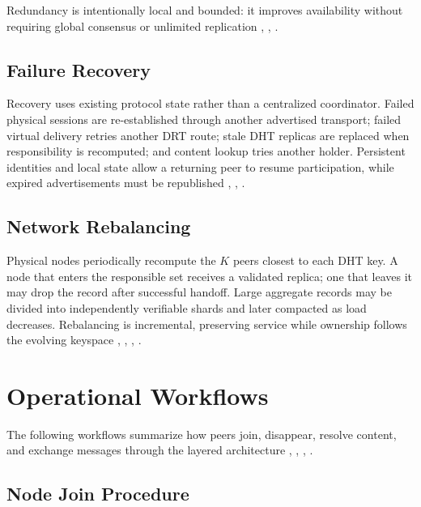 \documentclass[
  12pt,
  oneside,
  a4paper,
  chapter=TITLE,
  section=TITLE,
  english,
  brazil
]{abntex2}
\begin{document}
Redundancy is intentionally local and bounded: it improves availability without
requiring global consensus or unlimited replication \cite{tosic2022spatial}, \cite{augustine2022byzantine}, \cite{qian2016garlic}.

\subsection{Failure Recovery}

Recovery uses existing protocol state rather than a centralized coordinator. Failed
physical sessions are re-established through another advertised transport; failed
virtual delivery retries another DRT route; stale DHT replicas are replaced when
responsibility is recomputed; and content lookup tries another holder. Persistent
identities and local state allow a returning peer to resume participation, while
expired advertisements must be republished \cite{li2022unreachable}, \cite{augustine2022byzantine}, \cite{qian2016garlic}.

\subsection{Network Rebalancing}

Physical nodes periodically recompute the $K$ peers closest to each DHT key. A node
that enters the responsible set receives a validated replica; one that leaves it may
drop the record after successful handoff. Large aggregate records may be divided into
independently verifiable shards and later compacted as load decreases. Rebalancing is
incremental, preserving service while ownership follows the evolving keyspace \cite{stoica2001chord},
\cite{maymounkov2002kademlia}, \cite{rowstron2001pastry}, \cite{augustine2022byzantine}.





\section{Operational Workflows}

The following workflows summarize how peers join, disappear, resolve content, and
exchange messages through the layered architecture \cite{li2022unreachable}, \cite{augustine2022byzantine}, \cite{mirzaei2018pk}, \cite{qian2016garlic}.

\subsection{Node Join Procedure}
\end{document}

